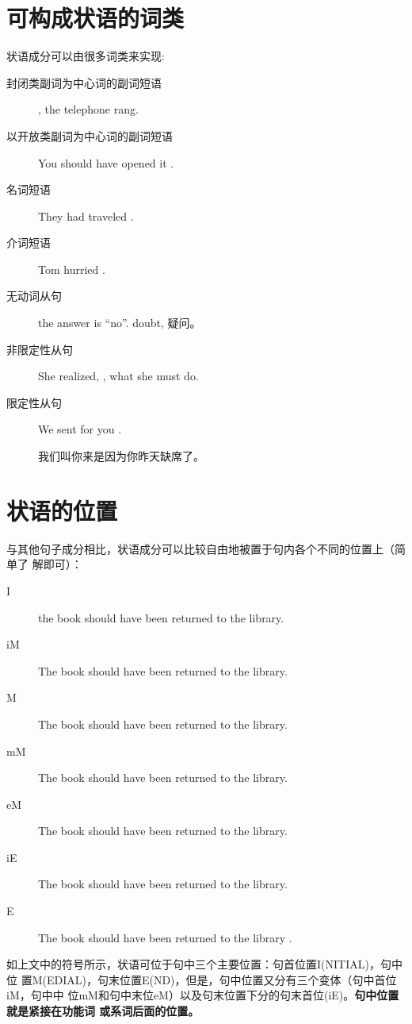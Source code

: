 \section{可构成状语的词类}

状语成分可以由很多词类来实现:
\begin{description}
\item[封闭类副词为中心词的副词短语] , the telephone rang.
\item[以开放类副词为中心词的副词短语] You should have opened it .
\item[名词短语] They had traveled .
\item[介词短语] Tom hurried .
\item[无动词从句]  the answer is ``no''. doubt, 疑问。
\item[非限定性从句] She realized, , what she must do.
\item[限定性从句] We sent for you .

  我们叫你来是因为你昨天缺席了。
\end{description}

\section{状语的位置}

与其他句子成分相比，状语成分可以比较自由地被置于句内各个不同的位置上（简单了
解即可）：
\begin{description}
\item[I]  the book should have been returned to the library.
\item[iM] The book  should have been returned to the library.
\item[M] The book should  have been returned to the library.
\item[mM] The book should have  been returned to the library.
\item[eM] The book should have been  returned to the library.
\item[iE] The book should have been returned  to the library.
\item[E] The book should have been returned to the library .
\end{description}

如上文中的符号所示，状语可位于句中三个主要位置：句首位置I(NITIAL)，句中位
置M(EDIAL)，句末位置E(ND)，但是，句中位置又分有三个变体（句中首位iM，句中中
位mM和句中末位eM）以及句末位置下分的句末首位(iE)。\textbf{句中位置就是紧接在功能词
  或系词后面的位置。}

